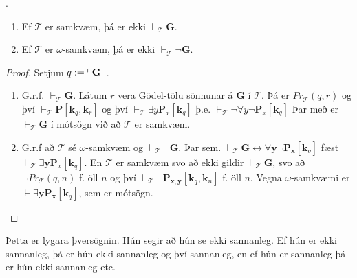 \documentclass[12pt]{book}
\newcommand{\cT}{\mathcal{T}}
\newcommand{\mb}[1]{\mathbf{#1}}
\newcommand{\bG}{\mathbf{G}}
\newcommand{\bx}{\mathbf{x}}
\newcommand{\bk}{\mathbf{k}}
\newcommand{\by}{\mathbf{y}}
\DeclarePairedDelimiter{\god}{\ulcorner}{\urcorner}
\begin{document}
\begin{setn}
  .
  \begin{enumerate}
  \item Ef $\cT$ er samkvæm, þá er ekki $\vdash_{\cT} \bG$.
  \item Ef $\cT$ er $\omega$-samkvæm, þá er ekki $\vdash_{\cT} \lnot \bG$.
  \end{enumerate}
\end{setn}

\begin{proof}
  Setjum $q := \god{\bG}$.
  \begin{enumerate}[(1)]
  \item G.r.f. $\vdash_{\cT} \bG$. Látum $r$ vera Gödel-tölu sönnunar á
    $\bG$ í $\cT$. Þá er $Pr_{\cT}(q,r)$ og því
    $\vdash_{\cT} \mb{P} [\bk_q, \bk_r]$ og því
    $\vdash_{\cT} \exists y \mb{P}_x [\bk_q]$ þ.e.
    $\vdash_{\cT} \lnot \forall y \lnot \mb{P}_x[\bk_q]$ Þar með er
    $\vdash_{\cT} \bG$ í mótsögn við að $\cT$ er samkvæm.


  \item G.r.f að $\cT$ sé $\omega$-samkvæm og  $\vdash_{\cT} \lnot \bG$. Þar sem.
    $\vdash_{\cT} \bG \leftrightarrow \forall \by \lnot \mb{P}_{\bx}[\bk_q]$ fæst
    $\vdash_{\cT} \exists \by \mb{P}_x[\bk_q]$.
    En $\cT$ er samkvæm svo að ekki gildir $\vdash_{\cT} \bG$, svo að
    $\lnot Pr_{\cT}(q,n)$ f. öll $n$ og því
    $\vdash_{\cT} \lnot \mb{P}_{\bx,\by}[\bk_q,\bk_n]$ f. öll $n$.
    Vegna $\omega$-samkvæmi er $\vdash \exists \by \mb{P}_{\bx}[\bk_q]$, sem er mótsögn.

  \end{enumerate}
\end{proof}

Þetta er lygara þversögnin. Hún segir að hún se ekki sannanleg.
Ef hún er ekki sannanleg, þá er hún ekki sannanleg og því sannanleg, en
ef hún er sannanleg þá er hún ekki sannanleg etc.

  
\end{document}
